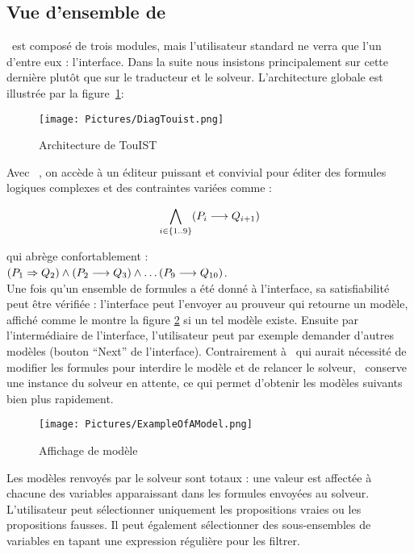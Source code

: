 \subsection{Vue d'ensemble de \touist}\label{sec:sat_interface}


\touist\ est composé de trois modules, mais l'utilisateur standard ne verra que l'un d'entre eux : l'interface. Dans la suite nous insistons principalement sur cette dernière plut\^ot que sur le traducteur et le solveur. L'architecture globale est illustr\'{e}e par la figure~\ref{fig:architectureTouisT}: 

\begin{figure}[htbp]
\centering
\texttt{[image: Pictures/DiagTouist.png]}
  \caption{Architecture de TouIST}
  \label{fig:architectureTouisT}
\end{figure}

Avec \touist\ , on accède à un éditeur puissant et convivial pour éditer des formules logiques complexes et des contraintes variées comme :

$$\bigwedge_{i \in \{1..9\}} (P_i \longrightarrow Q_{i+1})$$

qui abrège confortablement :\\ 

$(P_1 \Rightarrow Q_2) \wedge (P_2 \longrightarrow Q_3) \wedge \ldots (P_9\longrightarrow Q_{10})$. 
\\

Une fois qu'un ensemble de formules a été donné à l'interface, sa satisfiabilité peut \^etre vérifiée : l'interface peut l'envoyer au prouveur qui retourne un modèle, affich\'{e} comme le montre la figure \ref{fig:ExampleOfAModel} si un tel mod\`{e}le existe. Ensuite par l'intermédiaire de l'interface, l'utilisateur peut par exemple demander d'autres modèles (bouton ``Next'' de l'interface). Contrairement à \satoulouse\ qui aurait nécessité de modifier les formules pour interdire le modèle et de relancer le solveur, \touist\ conserve une instance du solveur en attente, ce qui permet d'obtenir les modèles suivants bien plus rapidement.

\begin{figure}[htbp]
\centering
\texttt{[image: Pictures/ExampleOfAModel.png]}
  \caption{Affichage de mod\`{e}le}
  \label{fig:ExampleOfAModel}
\end{figure}

Les mod\`{e}les renvoy\'{e}s par le solveur sont totaux : une valeur est affect\'{e}e \`{a} chacune des variables apparaissant dans les formules envoy\'{e}es au solveur. L'utilisateur peut s\'{e}lectionner uniquement les propositions vraies ou les propositions fausses. Il peut \'{e}galement s\'{e}lectionner des sous-ensembles de variables en tapant une expression r\'{e}guli\`{e}re pour les filtrer.

